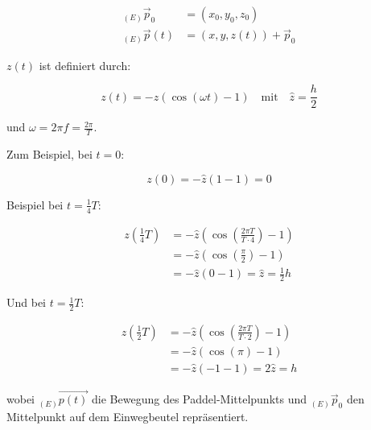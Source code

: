 \begin{equation}
    \begin{aligned}
        _{(E)}\vec{p}_{0} &= (x_{0}, y_{0}, z_{0})\\
        _{(E)}\vec{p}(t) &= (x, y, z(t)) + \vec{p}_{0}  
    \end{aligned} 
\end{equation}

\( z(t) \) ist definiert durch:

\begin{equation}
    z(t) = -\hat{z}(\cos(\omega t)-1)  \quad \text{mit} \quad \hat{z} = \frac{h}{2}
\end{equation}

und \( \omega = 2 \pi f = \frac{2 \pi}{T} \).

Zum Beispiel, bei \( t = 0 \):

\begin{equation}
    z(0) = -\hat{z}(1-1) = 0
\end{equation}

Beispiel bei \( t = \frac{1}{4}T \):

\begin{equation}
    \begin{aligned}
        z\left(\frac{1}{4}T\right) &= -\hat{z}\left(\cos\left(\frac{2\pi T}{T \cdot 4}\right) - 1\right) \\
        &= -\hat{z}\left(\cos\left(\frac{\pi}{2}\right) - 1\right) \\
        &= -\hat{z}(0 - 1) = \hat{z} = \frac{1}{2} h
    \end{aligned}
\end{equation}

Und bei \( t = \frac{1}{2}T \):

\begin{equation}
    \begin{aligned}
        z\left(\frac{1}{2}T\right) &= -\hat{z}\left(\cos\left(\frac{2\pi T}{T \cdot 2}\right) - 1\right) \\
        &= -\hat{z}\left(\cos(\pi) - 1\right) \\
        &= -\hat{z}(-1 - 1) = 2\hat{z} = h
    \end{aligned}
\end{equation}


wobei \( _{(E)}\vec{p(t)} \) die Bewegung des Paddel-Mittelpunkts und \( _{(E)}\vec{p}_{0} \) den Mittelpunkt auf dem Einwegbeutel repräsentiert.

